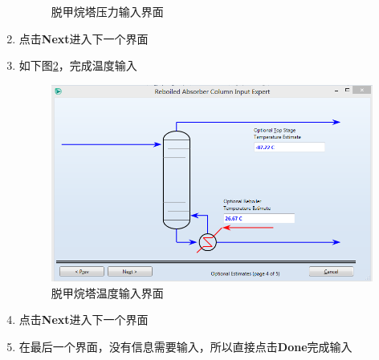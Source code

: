 \documentclass[UTF8]{ctexart}
\begin{document}
\begin{enumerate}
\begin{figure}[!htbp]
	\caption{脱甲烷塔压力输入界面}
	\label{figure2}
	\end{figure}
	\item 点击\textbf{Next}进入下一个界面
	\item 如下图\ref{figure3}，完成温度输入
	\begin{figure}[!htbp]
	\centering
	\includegraphics[scale=0.5]{DC1_Temperature.PNG}
	\caption{脱甲烷塔温度输入界面}
	\label{figure3}
	\end{figure}
	\item 点击\textbf{Next}进入下一个界面
	\item 在最后一个界面，没有信息需要输入，所以直接点击\textbf{Done}完成输入
\end{enumerate}
\end{document}
